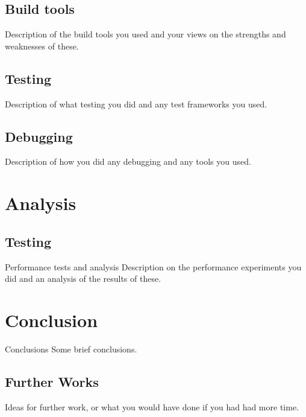 \documentclass[a4paper,11pt]{article}
\begin{document}
\subsection{Build tools}
Description of the build tools you used and your views on the strengths and weaknesses of these.

\subsection{Testing}
Description of what testing you did and any test frameworks you used.

\subsection{Debugging}
 Description of how you did any debugging and any tools you used.
 
 \section{Analysis}
 
 \subsection{Testing}
Performance tests and analysis Description on the performance experiments you did and an analysis
of the results of these.
 
 \section{Conclusion}
Conclusions Some brief conclusions.
 
\subsection{Further Works}
 Ideas for further work, or what you would have done if you had had more time.
\end{document}
